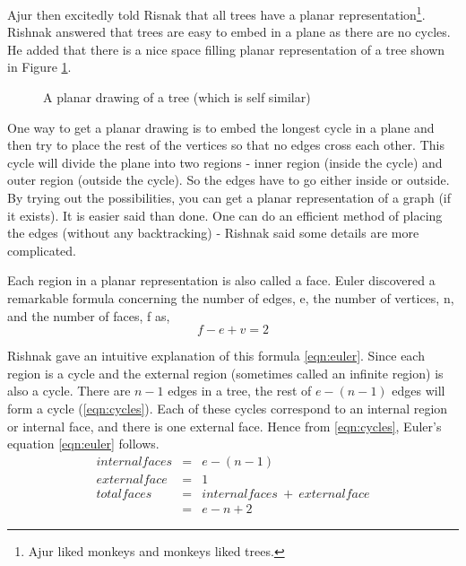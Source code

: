  Ajur then excitedly told Risnak that all trees have a planar representation\footnote{Ajur liked monkeys and monkeys liked trees.}. Rishnak answered that trees are easy to embed in a plane as there are
 no cycles. He added that there is a nice space filling planar representation of a tree shown in Figure \ref{9g7}.
\begin{figure}
\begin{center}    

  \caption{ A planar drawing of a tree (which is self similar)}\label{9g7}
  \end{center}
\end{figure}

One way to get a planar drawing is to embed the longest cycle in a plane and then try to place the rest of the vertices so that no edges cross each other. This cycle will divide the plane into two regions - inner region (inside the cycle) and outer region (outside the cycle). So the edges have to go either inside or outside. By trying out the possibilities, you can get a planar representation of a graph (if it exists). It is easier said than done. One can do an efficient method of placing the edges (without any backtracking) - Rishnak said some details are more complicated. 

Each region in a planar representation is also called a face. Euler discovered a remarkable formula concerning the number of edges, e, the number of vertices, n, and the number of faces, f as,
\begin{equation}
\label{eqn:euler}
  f-e+v=2 
\end{equation}

 

Rishnak gave an intuitive explanation of this formula \ref{eqn:euler}. Since each region is a cycle and the external region (sometimes called an infinite region) is also a cycle. 
There are $n-1$ edges in a tree, the rest of $e-(n-1)$ edges will form a cycle (\ref{eqn:cycles}). Each of these cycles correspond to an internal region or internal face, and there is one external face. Hence from \ref{eqn:cycles}, Euler's equation \ref{eqn:euler} follows.
\begin{eqnarray*}
    \label{eqn:cycles}
    internal faces&=&e-(n-1)\\
    external face&=&1\\
    total faces&=& internal faces~+~external face\\
    &=&e-n+2
\end{eqnarray*}

